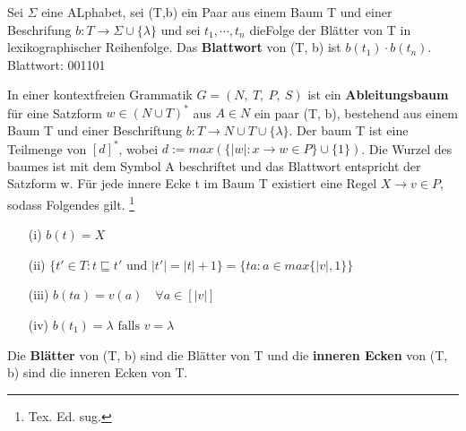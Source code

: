     Sei \(\Sigma\) eine ALphabet, sei (T,b) ein Paar aus einem Baum T und einer Beschrifung \(b: T \to \Sigma \cup \{\lambda\}\) und sei \(t_1, \cdots, t_n\) dieFolge der Blätter von T in lexikographischer Reihenfolge. Das \textbf{Blattwort} von (T, b) ist \(b(t_1) \cdot b(t_n)\). Blattwort: 001101
    {
    }
\newpage
{} 
    In einer kontextfreien Grammatik \(G = (N,\ T,\ P,\ S)\) ist ein \textbf{Ableitungsbaum} für eine Satzform \(w \in (N \cup T)^*\) aus \(A \in N\) ein paar (T, b), bestehend aus einem Baum T und einer Beschriftung \(b: T \to N \cup T \cup \{\lambda\}\). Der baum T ist eine Teilmenge von \([d]^*\), wobei \(d:= max (\{|w|: x \to w \in P\} \cup \{1\})\). Die Wurzel des baumes ist mit dem Symbol A beschriftet und das Blattwort entspricht der Satzform w. Für jede innere Ecke t im Baum T existiert eine Regel \(X \to v \in P\), sodass Folgendes gilt.    \footnote{Tex. Ed. sug.}
    \begin{itemize}
        \item [(i)] \(b(t) = X\)
        \item [(ii)] \(\{t' \in T : t \sqsubseteq t' \text{ und } |t'| = |t| + 1\} = \{ta : a \in max \{|v|, 1\}\}\)
        \item [(iii)] \(b(ta) = v(a) \quad \forall a \in [|v|]\)
        \item [(iv)] \(b(t_1) = \lambda \text{ falls } v = \lambda\)
    \end{itemize}
    Die \textbf{Blätter} von (T, b) sind die Blätter von T und die \textbf{inneren Ecken} von (T, b) sind die inneren Ecken von T.

